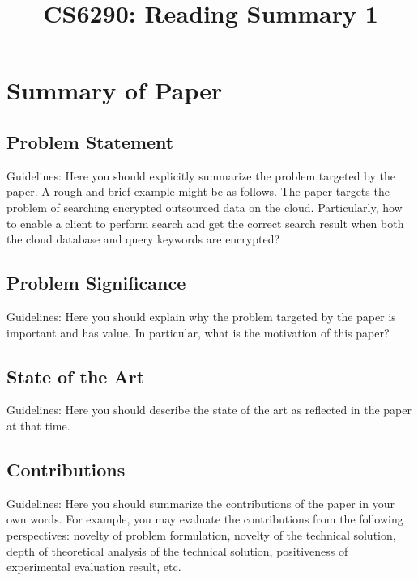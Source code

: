\documentclass[conference]{IEEEtran}
\begin{document}
\title{CS6290: Reading Summary 1}

\author{
}

\maketitle


\section{Summary of Paper \cite{SongWP00}}


\subsection{Problem Statement}
Guidelines: Here you should explicitly summarize the problem targeted by the paper. A rough and brief example might be as follows.
%
The paper targets the problem of searching encrypted outsourced data on the cloud.
%
Particularly, how to enable a client to perform search and get the correct search result when both the cloud database and query keywords are encrypted?

\subsection{Problem Significance}
Guidelines: Here you should explain why the problem targeted by the paper is important and has value.
%
In particular, what is the motivation of this paper?


\subsection{State of the Art}

Guidelines: Here you should describe the state of the art as reflected in the paper at that time.
%



\subsection{Contributions}
Guidelines: Here you should summarize the contributions of the paper in your own words.
%
For example, you may evaluate the contributions from the following perspectives: novelty of problem formulation, novelty of the technical solution, depth of theoretical analysis of the technical solution, positiveness of experimental evaluation result, etc.
\end{document}
